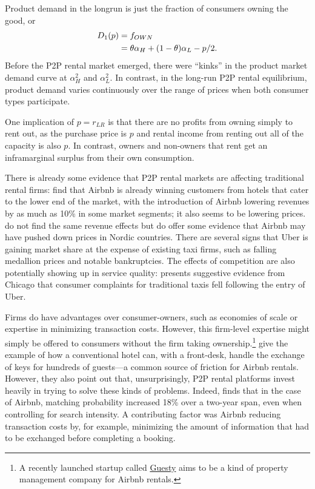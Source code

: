 \documentclass[11pt]{article}
\begin{document}
Product demand in the longrun is just the fraction of consumers owning the good, or 
\begin{align}
D_1(p) &= f_{OWN} \notag \\  
     &= \theta \alpha_H + (1-\theta) \alpha_L - p/2.  
\end{align} 
Before the P2P rental market emerged, there were ``kinks'' in the product market demand curve at $\alpha_H^2$ and $\alpha_L^2$. 
In contrast, in the long-run P2P rental equilibrium, product demand varies continuously over the range of prices when both consumer types participate.

One implication of $p = r_{LR}$ is that there are no profits from owning simply to rent out, as the purchase price is $p$ and rental income from renting out all of the capacity is also $p$.  
In contrast, owners and non-owners that rent get an inframarginal surplus from their own consumption. 

There is already some evidence that P2P rental markets are affecting traditional rental firms: 
\cite{byers2013rise} find that Airbnb is already winning customers from hotels that cater to the lower end of the market, with the introduction of Airbnb lowering revenues by as much as 10\% in some market segments;
it also seems to be lowering prices. 
\cite{neeser2015does} do not find the same revenue effects but do offer some evidence that Airbnb may have pushed down prices in Nordic countries.
There are several signs that Uber is gaining market share at the expense of existing taxi firms, such as falling medallion prices and notable bankruptcies.
The effects of competition are also potentially showing up in service quality:
\cite{wallsten2015} presents suggestive evidence from Chicago that consumer complaints for traditional taxis fell following the entry of Uber. 

Firms do have advantages over consumer-owners, such as economies of scale or expertise in minimizing transaction costs. 
However, this firm-level expertise might simply be offered to consumers without the firm taking ownership.\footnote{
  A recently launched startup called \href{https://www.guesty.com/}{Guesty} aims to be a kind of property management company for Airbnb rentals.
}
\cite{edelman2015efficiencies} give the example of how a conventional hotel can, with a front-desk, handle the exchange of keys for hundreds of guests---a common source of friction for Airbnb rentals.
However, they also point out that, unsurprisingly, P2P rental platforms invest heavily in trying to solve these kinds of problems. 
Indeed, \cite{fradkin2012online} finds that in the case of Airbnb, matching probability increased 18\% over a two-year span, even when controlling for search intensity.
A contributing factor was Airbnb reducing transaction costs by, for example, minimizing the amount of information that had to be exchanged before completing a booking. 
\end{document}
